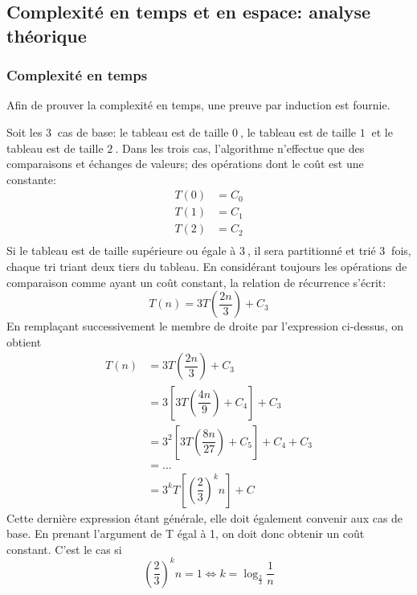 \documentclass[a4paper, 12pt]{article}
\begin{document}
	\subsection{Complexité en temps et en espace: analyse théorique}
	\subsubsection*{Complexité en temps}
	Afin de prouver la complexité en temps, une preuve par induction est fournie.\par
	Soit les \(\SI{3}{}\) cas de base: le tableau est de taille \(\SI{0}{}\), le tableau est de taille \(\SI{1}{}\) et le tableau est de taille \(\SI{2}{}\). Dans les trois cas, l'algorithme n'effectue que des comparaisons et échanges de valeurs; des opérations dont le coût est une constante:
	\begin{align*}
	    T\left(0\right) &= C_0\\
	    T\left(1\right) &= C_1\\
	    T\left(2\right) &= C_2\\
	\end{align*}
	Si le tableau est de taille supérieure ou égale à \(\SI{3}{}\), il sera partitionné et trié \(\SI{3}{}\) fois, chaque tri triant deux tiers du tableau. En considérant toujours les opérations de comparaison comme ayant un coût constant, la relation de récurrence s'écrit:
	\begin{displaymath}
	    T\left(n\right) = 3T\left(\dfrac{2n}{3}\right) + C_3
	\end{displaymath}
	En remplaçant successivement le membre de droite par l'expression ci-dessus, on obtient
	\begin{align*}
	    T\left(n\right) &= 3T\left(\dfrac{2n}{3}\right) + C_3\\
	    &= 3\left[3T\left(\dfrac{4n}{9}\right) + C_4\right] + C_3\\
	    &= 3^2\left[3T\left(\dfrac{8n}{27}\right) + C_5\right] + C_4 + C_3\\
	    &= ...\\
	    &= 3^k T\left[\left(\dfrac{2}{3}\right)^k n\right] + C
	\end{align*}
	Cette dernière expression étant générale, elle doit également convenir aux cas de base. En prenant l'argument de T égal à 1, on doit donc obtenir un coût constant. C'est le cas si
	\begin{displaymath}
	    \left(\dfrac{2}{3}\right)^k n = 1\Leftrightarrow k = \log_{\frac{2}{3}}\dfrac{1}{n}
	\end{displaymath}
\end{document}
